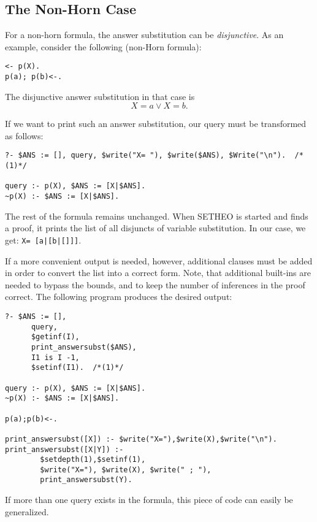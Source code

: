 \subsection{The Non-Horn Case}

For a non-horn formula, the answer substitution can be {\em disjunctive}.
As an example, consider the following (non-Horn formula):

\begin{verbatim}
<- p(X).
p(a); p(b)<-.
\end{verbatim}
The disjunctive answer substitution in that case is
\[ X = a \vee X = b. \]

If we want to print such an answer substitution, our query must be transformed
as follows:
\begin{verbatim}
?- $ANS := [], query, $write("X= "), $write($ANS), $Write("\n").  /*(1)*/

query :- p(X), $ANS := [X|$ANS].
~p(X) :- $ANS := [X|$ANS].
\end{verbatim}
The rest of the formula remains unchanged.
When SETHEO is started and finds a proof, it prints the list of
all disjuncts of variable substitution. In our case, we get:
\verb+X= [a|[b|[]]]+.

If a more convenient output is needed, however, additional clauses
must be added in order to convert the list into a correct form.
Note, that additional built-ins are needed to bypass the bounds, and
to keep the number of inferences in the proof correct.
The following program produces the desired output:

\begin{verbatim}
?- $ANS := [], 
      query, 
      $getinf(I), 
      print_answersubst($ANS), 
      I1 is I -1,
      $setinf(I1).  /*(1)*/
 
query :- p(X), $ANS := [X|$ANS].
~p(X) :- $ANS := [X|$ANS].

p(a);p(b)<-.

print_answersubst([X]) :- $write("X="),$write(X),$write("\n").
print_answersubst([X|Y]) :- 
        $setdepth(1),$setinf(1),
        $write("X="), $write(X), $write(" ; "),
        print_answersubst(Y).
\end{verbatim}

If more than one query exists in the formula, this piece of code
can easily be generalized.

